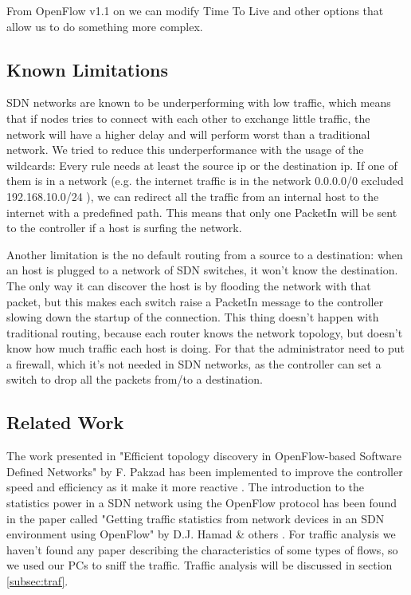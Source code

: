 \documentclass[article,10pt]{IEEEtran}
\begin{document}
From OpenFlow v1.1 on we can modify Time To Live and other options that allow us to do something more complex.

\subsection{Known Limitations}
SDN networks are known to be underperforming with low traffic, which means that if nodes tries to connect with each other
to exchange little traffic, the network will have a higher delay and will perform worst than a
traditional network. We tried to reduce this underperformance with the usage of the wildcards:
Every rule needs at least the source ip or the destination ip. If one of them is in a network
(e.g. the internet traffic is in the network 0.0.0.0/0 excluded 192.168.10.0/24 ),
we can redirect all the traffic from an internal host to the internet with a predefined
path. This means that only one PacketIn will be sent to the controller if a host is surfing the network.

Another limitation is the no default routing from a source to a destination: when an host
is plugged to a network of SDN switches, it won't know the destination. The only way it can
discover the host is by flooding the network with that packet, but this makes each switch raise a PacketIn message to the controller
slowing down the startup of the connection. This thing doesn't happen with traditional routing, because each router knows
the network topology, but doesn't know how much traffic each host is doing. For that the administrator need to put a firewall, which it's not needed in SDN networks,
as the controller can set a switch to drop all the packets from/to a destination.


\subsection{Related Work}
  The work presented in
"Efficient topology discovery in OpenFlow-based Software Defined Networks" by F. Pakzad 
has been implemented to improve the controller speed and efficiency as it make it more reactive \cite{farzaneh}.
\newline The introduction to the statistics power in a SDN network using the OpenFlow protocol has been found
in the paper called "Getting traffic statistics from network devices in an SDN environment using OpenFlow" by D.J. Hamad \& others \cite{stat}.
\newline For traffic analysis we haven't found any paper describing the characteristics of
some types of flows, so we used our PCs to sniff the traffic. \newline 
Traffic analysis will be discussed in section \ref{subsec:traf}.
\end{document}
